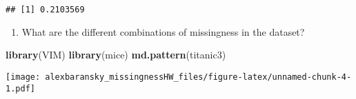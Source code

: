 \documentclass[]{article}
\newenvironment{Shaded}{\begin{snugshade}}{\end{snugshade}}
\newcommand{\KeywordTok}[1]{\textcolor[rgb]{0.13,0.29,0.53}{\textbf{#1}}}
\newcommand{\NormalTok}[1]{#1}
\providecommand{\tightlist}{%
  \setlength{\itemsep}{0pt}\setlength{\parskip}{0pt}}
\begin{document}
\begin{verbatim}
## [1] 0.2103569
\end{verbatim}

\begin{enumerate}
\def\labelenumi{\arabic{enumi}.}
\setcounter{enumi}{3}
\tightlist
\item
  What are the different combinations of missingness in the dataset?
\end{enumerate}

\begin{Shaded}
\begin{Highlighting}[]
\KeywordTok{library}\NormalTok{(VIM)}
\KeywordTok{library}\NormalTok{(mice)}
\KeywordTok{md.pattern}\NormalTok{(titanic3)}
\end{Highlighting}
\end{Shaded}

\texttt{[image: alexbaransky\_missingnessHW\_files/figure-latex/unnamed-chunk-4-1.pdf]}
\end{document}
